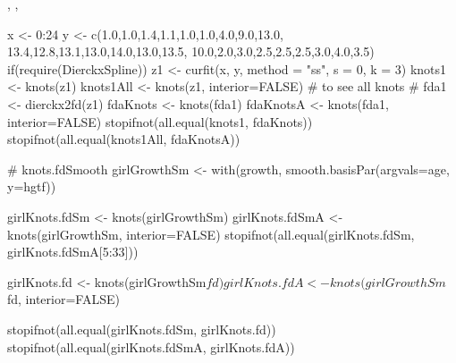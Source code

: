 \begin{SeeAlso}\relax
{},
,
\end{SeeAlso}
\begin{Examples}
\begin{ExampleCode}
x <- 0:24
y <- c(1.0,1.0,1.4,1.1,1.0,1.0,4.0,9.0,13.0,
       13.4,12.8,13.1,13.0,14.0,13.0,13.5,
       10.0,2.0,3.0,2.5,2.5,2.5,3.0,4.0,3.5)
if(require(DierckxSpline)){
   z1 <- curfit(x, y, method = "ss", s = 0, k = 3)
   knots1 <- knots(z1)
   knots1All <- knots(z1, interior=FALSE) # to see all knots
#
   fda1 <- dierckx2fd(z1)
   fdaKnots <- knots(fda1)
   fdaKnotsA <- knots(fda1, interior=FALSE)
   stopifnot(all.equal(knots1, fdaKnots))
   stopifnot(all.equal(knots1All, fdaKnotsA))
}

# knots.fdSmooth 
girlGrowthSm <- with(growth, smooth.basisPar(argvals=age, y=hgtf))

girlKnots.fdSm <- knots(girlGrowthSm) 
girlKnots.fdSmA <- knots(girlGrowthSm, interior=FALSE)
stopifnot(all.equal(girlKnots.fdSm, girlKnots.fdSmA[5:33]))

girlKnots.fd <- knots(girlGrowthSm$fd) 
girlKnots.fdA <- knots(girlGrowthSm$fd, interior=FALSE)

stopifnot(all.equal(girlKnots.fdSm, girlKnots.fd))
stopifnot(all.equal(girlKnots.fdSmA, girlKnots.fdA))

\end{ExampleCode}
\end{Examples}

